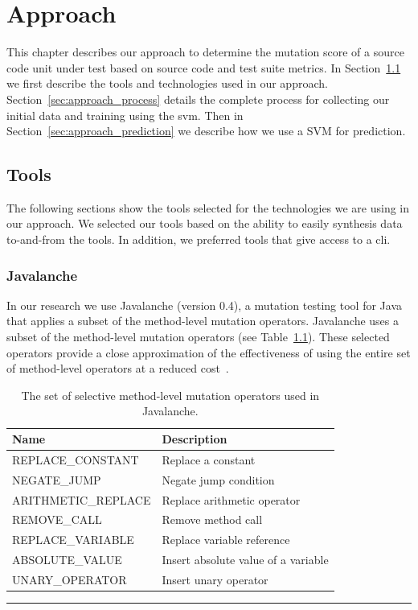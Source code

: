 \chapter{Approach}
\label{chap:approach}
This chapter describes our approach to determine the mutation score of a source code unit under test based on source code and test suite metrics. In Section~\ref{sec:approach_tools} we first describe the tools and technologies used in our approach. Section~\ref{sec:approach_process} details the complete process for collecting our initial data and training using the \gls{svm}. Then in Section~\ref{sec:approach_prediction} we describe how we use a SVM for prediction.


\section{Tools}
\label{sec:approach_tools}
The following sections show the tools selected for the technologies we are using in our approach. We selected our tools based on the ability to easily synthesis data to-and-from the tools. In addition, we preferred tools that give access to a \gls{cli}.


\subsection{Javalanche}
\label{subsec:approach_javalanche}
In our research we use Javalanche (version 0.4), a mutation testing tool for Java~\cite{SZ09} that applies a subset of the method-level mutation operators. Javalanche uses a subset of the method-level mutation operators (see Table~\ref{tab:javalanche_operators}). These selected operators provide a close approximation of the effectiveness of using the entire set of method-level operators at a reduced cost~\cite{OLR+96}.

\begin{table}[h]
  \centering
  \begin{tabular}{|l|l|}
    \hline
    \rowcolor[RGB]{169,196,223}
    \textbf{Name} & \textbf{Description} \\
    \hline REPLACE\_CONSTANT & Replace a constant \\
    \hline NEGATE\_JUMP & Negate jump condition \\
    \hline ARITHMETIC\_REPLACE & Replace arithmetic operator \\
    \hline REMOVE\_CALL & Remove method call \\
    \hline REPLACE\_VARIABLE & Replace variable reference\\
    \hline ABSOLUTE\_VALUE & Insert absolute value of a variable \\
    \hline UNARY\_OPERATOR & Insert unary operator \\
    \hline
  \end{tabular}
  \caption{The set of selective method-level mutation operators used in Javalanche.}
  \label{tab:javalanche_operators}
  \vspace{2mm}
  \hrule
\end{table}

